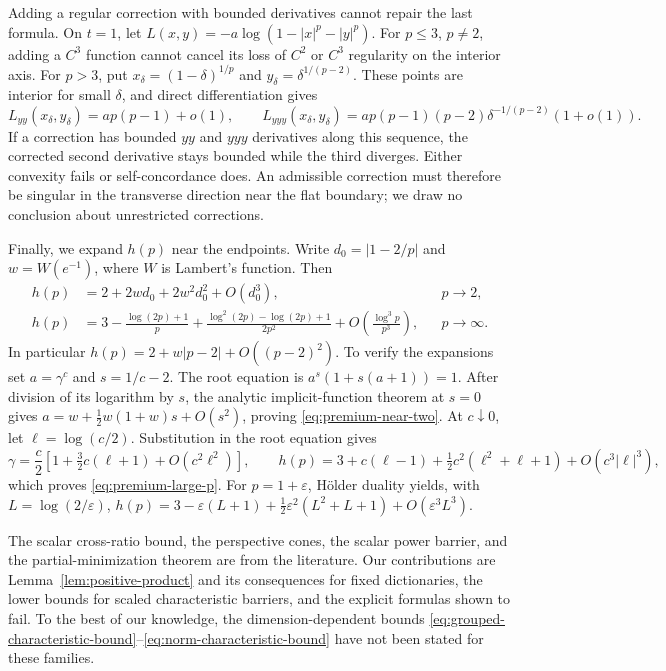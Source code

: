 Adding a regular correction with bounded derivatives cannot repair the
last formula.
On $t=1$, let
$L(x,y)=-a\log(1-|x|^p-|y|^p)$.
For $p\leq3$, $p\ne2$, adding a $C^3$ function cannot cancel its
loss of $C^2$ or $C^3$ regularity on the interior axis.
For $p>3$, put $x_\delta=(1-\delta)^{1/p}$ and
$y_\delta=\delta^{1/(p-2)}$. These points are interior for small
$\delta$, and direct differentiation gives
\[
 L_{yy}(x_\delta,y_\delta)=ap(p-1)+o(1),\qquad
 L_{yyy}(x_\delta,y_\delta)
 =ap(p-1)(p-2)\delta^{-1/(p-2)}(1+o(1)).
\]
If a correction has bounded $yy$ and $yyy$ derivatives along this
sequence, the corrected second derivative stays bounded while the
third diverges. Either convexity fails or self-concordance does.
An admissible correction must therefore be singular in the transverse
direction near the flat boundary; we draw no conclusion about
unrestricted corrections.

Finally, we expand $h(p)$ near the endpoints. Write
$d_0=|1-2/p|$ and $w=W(e^{-1})$, where $W$ is Lambert's function.
Then
\begin{align}
 h(p)&=2+2wd_0+2w^2d_0^2+O(d_0^3),&&p\to2,
 \label{eq:premium-near-two}\\
 h(p)&=3-\frac{\log(2p)+1}{p}
 +\frac{\log^2(2p)-\log(2p)+1}{2p^2}
 +O\left(\frac{\log^3 p}{p^3}\right),&&p\to\infty.
 \label{eq:premium-large-p}
\end{align}
In particular $h(p)=2+w|p-2|+O((p-2)^2)$.
To verify the expansions set $a=\gamma^c$ and $s=1/c-2$.
The root equation is $a^s(1+s(a+1))=1$.
After division of its logarithm by $s$, the analytic implicit-function
theorem at $s=0$ gives
$a=w+\tfrac12w(1+w)s+O(s^2)$, proving
\eqref{eq:premium-near-two}. At $c\downarrow0$, let
$\ell=\log(c/2)$. Substitution in the root equation gives
\[
 \gamma=\frac c2\left[1+\tfrac32c(\ell+1)
                  +O(c^2\ell^2)\right],\qquad
 h(p)=3+c(\ell-1)+\tfrac12c^2(\ell^2+\ell+1)
                  +O(c^3|\ell|^3),
\]
which proves \eqref{eq:premium-large-p}. For $p=1+\varepsilon$,
H\"older duality yields, with $L=\log(2/\varepsilon)$,
$h(p)=3-\varepsilon(L+1)+\tfrac12\varepsilon^2(L^2+L+1)
+O(\varepsilon^3L^3)$.

The scalar cross-ratio bound, the perspective cones, the scalar power
barrier, and the partial-minimization theorem are from the literature.
Our contributions are Lemma~\ref{lem:positive-product} and its
consequences for fixed dictionaries, the lower bounds for scaled
characteristic barriers, and the explicit formulas shown to fail.
To the best of our knowledge, the dimension-dependent bounds
\eqref{eq:grouped-characteristic-bound}--\eqref{eq:norm-characteristic-bound}
have not been stated for these families.
